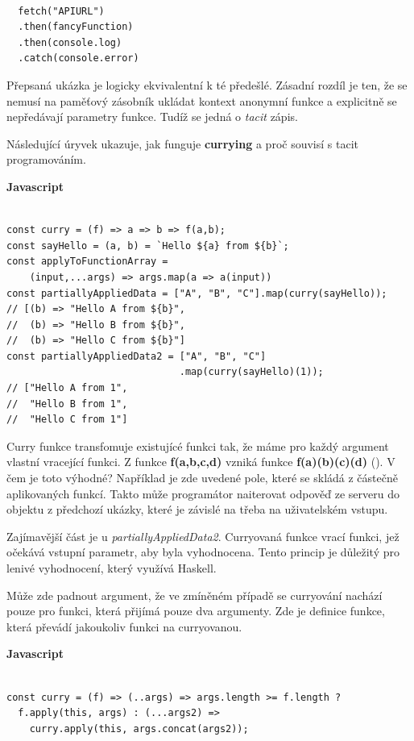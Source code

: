 \documentclass[male,czech]{kithesis}
\begin{document}
\begin{verbatim}

  fetch("APIURL")
  .then(fancyFunction)
  .then(console.log)
  .catch(console.error)

\end{verbatim}

Přepsaná ukázka je logicky ekvivalentní k té předešlé. 
Zásadní rozdíl je ten, 
že se nemusí na paměťový zásobník ukládat kontext anonymní funkce 
a explicitně se nepředávají parametry funkce. 
Tudíž se jedná o \textit{tacit} zápis.

Následující úryvek ukazuje, 
jak funguje \textbf{currying} a proč souvisí s tacit programováním.

\textbf{Javascript}
\begin{verbatim}

const curry = (f) => a => b => f(a,b);
const sayHello = (a, b) = `Hello ${a} from ${b}`;
const applyToFunctionArray = 
    (input,...args) => args.map(a => a(input))
const partiallyAppliedData = ["A", "B", "C"].map(curry(sayHello)); 
// [(b) => "Hello A from ${b}", 
//  (b) => "Hello B from ${b}", 
//  (b) => "Hello C from ${b}"]
const partiallyAppliedData2 = ["A", "B", "C"]
                              .map(curry(sayHello)(1)); 
// ["Hello A from 1", 
//  "Hello B from 1", 
//  "Hello C from 1"]

\end{verbatim}
Curry funkce transfomuje existujícé funkci tak, 
že máme pro každý argument vlastní vracející funkci. 
Z funkce \textbf{f(a,b,c,d)} vzniká funkce \textbf{f(a)(b)(c)(d)} (\cite{Currying}).
V čem je toto výhodné?
Například je zde uvedené pole, 
které se skládá z částečně aplikovaných funkcí. 
Takto může programátor naiterovat odpověď ze serveru do objektu z předchozí ukázky,
které je závislé na třeba na uživatelském vstupu. 

Zajímavější část je u \textit{partiallyAppliedData2}. 
Curryovaná funkce vrací funkci, 
jež očekává vstupní parametr, 
aby byla vyhodnocena. 
Tento princip je důležitý
pro lenivé vyhodnocení, 
který využívá Haskell.

Může zde padnout argument, 
že ve zmíněném případě se curryování nachází pouze pro funkci,
která přijímá pouze dva argumenty. 
Zde je definice funkce, 
která převádí jakoukoliv funkci na curryovanou.

\textbf{Javascript}
\begin{verbatim}

const curry = (f) => (..args) => args.length >= f.length ? 
  f.apply(this, args) : (...args2) => 
    curry.apply(this, args.concat(args2));

\end{verbatim}
\end{document}
